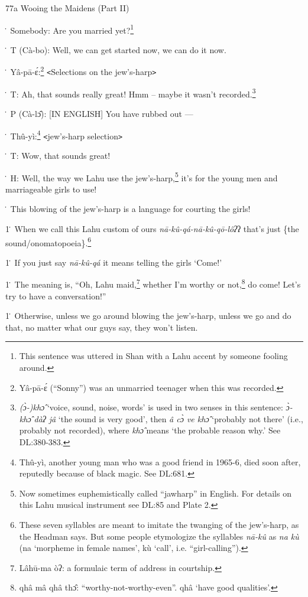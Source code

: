
77a Wooing the Maidens (Part II)

\. Somebody: Are you married yet?\footnote{This sentence was uttered in Shan with a Lahu accent by someone fooling around.}

\. T (Cà-bo): Well, we can get started now, we can do it now.

\. Yâ-pā-ɛ́:\footnote{Yâ-pā-ɛ́ (``Sonny'') was an unmarried teenager when this was recorded.} \texttt{<}Selections on the jew's-harp\texttt{>}

\. T: Ah, that sounds really great! Hmm -- maybe it wasn't recorded.\footnote{\textit{(ɔ̀-)khɔ̂} `voice, sound, noise, words' is used in two senses in this sentence: \textit{ɔ̀-khɔ̂ dàʔ jâ} `the sound is very good’, then \textit{â cɔ̀ ve khɔ̂} `probably not there’ (i.e., probably not recorded), where \textit{khɔ̂} means `the probable reason why.’ See DL:380-383.}

\. P (Cà-lɔ̂): [IN ENGLISH] You have rubbed out ---

\. Thû-yì:\footnote{Thû-yì, another young man who was a good friend in 1965-6, died soon after, reputedly because of black magic. See DL:681.} \texttt{<}jew's-harp selection\texttt{>}

\. T: Wow, that sounds great!

\. H: Well, the way we Lahu use the jew's-harp,\footnote{Now sometimes euphemistically called ``jawharp'' in English. For details on this Lahu musical instrument see DL:85 and Plate 2.} it's for the young men and marriageable girls to use!

\. This blowing of the jew's-harp is a language for courting the girls!

1\. When we call this Lahu custom of ours \textit{nā-kû-qá-nā-kû-qō-lôʔ}ʔ
that's just \{the sound/onomatopoeia\}.\footnote{These seven syllables are meant to imitate the twanging of the jew's-harp, as the Headman says. But some people etymologize the syllables \textit{nā-kû} as \textit{na kù} (na ‘morpheme in female names’, kù ‘call’, i.e. “girl-calling”).}

1\. If you just say \textit{nā-kû-qá} it means telling the girls `Come!'

1\. The meaning is, ``Oh, Lahu maid,\footnote{Lâhū-ma òʔ: a formulaic term of address in courtship.} whether I'm worthy or not,\footnote{qhâ mâ qhâ thɔ̂: ``worthy-not-worthy-even''. qhâ `have good qualities'.} do come!
Let's try to have a conversation!''

1\. Otherwise, unless we go around blowing the jew's-harp, unless we go and do that,
no matter what our guys say, they won't listen.

